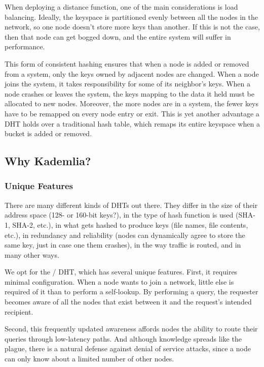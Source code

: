 \documentclass[11pt,twocolumn]{article}
\begin{document}
When deploying a distance function, one of the main considerations is load balancing.
Ideally, the keyspace is partitioned evenly between all the nodes in the network, so one node doesn't store more keys than another.
If this is not the case, then that node can get bogged down, and the entire system will suffer in performance.

This form of consistent hashing ensures that when a node is added or removed from a system, only the keys owned by adjacent nodes are changed. 
When a node joins the system, it takes responsibility for some of its neighbor's keys.
When a node crashes or leaves the system, the keys mapping to the data it held must be allocated to new nodes.
Moreover, the more nodes are in a system, the fewer keys have to be remapped on every node entry or exit.
This is yet another advantage a DHT holds over a traditional hash table, which remaps its entire keyspace when a bucket is added or removed.

\subsection{Why Kademlia?}

\subsubsection{Unique Features}
There are many different kinds of DHTs out there.
They differ in the size of their address space (128- or 160-bit keys?), in the type of hash function is used (SHA-1, SHA-2, etc.), in what gets hashed to produce keys (file names, file contents, etc.), in redundancy and reliability (nodes can dynamically agree to store the same key, just in case one them crashes), in the way traffic is routed, and in many other ways.

We opt for the \Kademlia/ DHT, which has several unique features.
First, it requires minimal configuration.
When a node wants to join a network, little else is required of it than to perform a self-lookup.
By performing a query, the requester becomes aware of all the nodes that exist between it and the request's intended recipient.

Second, this frequently updated awareness affords nodes the ability to route their queries through low-latency paths.
And although knowledge spreads like the plague, there is a natural defense against denial of service attacks, since a node can only know about a limited number of other nodes.
\end{document}
